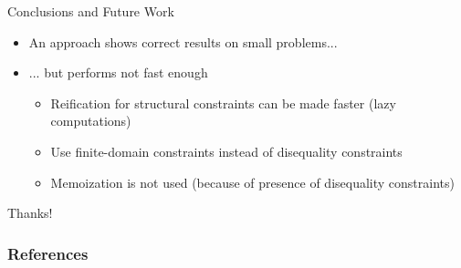 \documentclass[aspectratio=169
  , xcolor={svgnames}
  , hyperref={ colorlinks,citecolor=Blue
             , linkcolor=DarkRed,urlcolor=DarkBlue}
  , russian
  ]{beamer}
\begin{document}
\begin{frame}{Conclusions and Future Work}
\begin{itemize}
\item An approach shows correct results on small problems...
\item ... but performs not fast enough
\begin{itemize}
\item Reification for structural constraints can be made faster (lazy computations)
\item Use finite-domain constraints instead of disequality constraints 
\item Memoization is not used (because of presence of disequality constraints)
\end{itemize}
\end{itemize}
\end{frame}

\begin{frame}
\begin{center}
{\Huge Thanks!}
\end{center}
\end{frame}

\begin{frame}[t, allowframebreaks]
\frametitle{References}


\vspace{1cm}
\end{frame}
\end{document}
